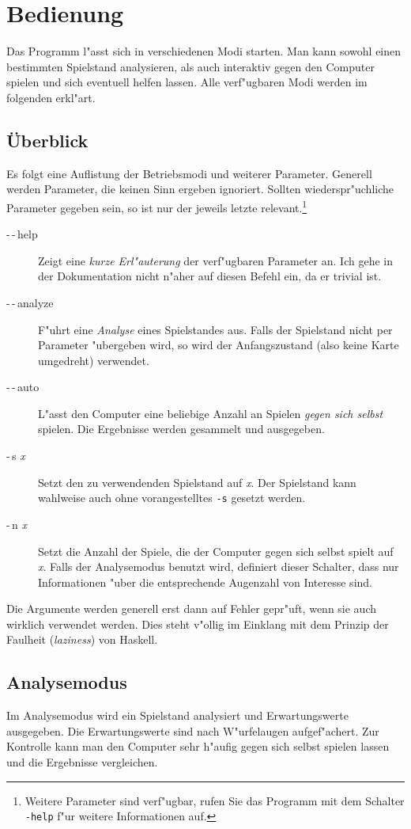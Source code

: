 \documentclass{scrreprt}
\begin{document}
\chapter{Bedienung}
Das Programm l"asst sich in verschiedenen Modi starten.  Man kann sowohl einen
bestimmten Spielstand analysieren, als auch interaktiv gegen den Computer
spielen und sich eventuell helfen lassen.  Alle verf"ugbaren Modi werden im
folgenden erkl"art.

\section{Überblick}
Es folgt eine Auflistung der Betriebsmodi und weiterer Parameter.  Generell
werden Parameter, die keinen Sinn ergeben ignoriert.  Sollten wiederspr"uchliche
Parameter gegeben sein, so ist nur der jeweils letzte relevant.\footnote{Weitere
Parameter sind verf"ugbar, rufen Sie das Programm mit dem Schalter \texttt
{-\-help} f"ur weitere Informationen auf.}

\begin{description}
\item[-\,-\,help] Zeigt eine \emph{kurze Erl"auterung} der verf"ugbaren
  Parameter an.  Ich gehe in der Dokumentation nicht n"aher auf diesen Befehl
  ein, da er trivial ist.
\item[-\,-\,analyze] F"uhrt eine \emph{Analyse} eines Spielstandes aus.  Falls
  der Spielstand nicht per Parameter "ubergeben wird, so wird der Anfangszustand
  (also keine Karte umgedreht) verwendet.
\item[-\,-\,auto] L"asst den Computer eine beliebige Anzahl an Spielen \emph
  {gegen sich selbst} spielen.  Die Ergebnisse werden gesammelt und ausgegeben.
\item[-\,s \textit{x}] Setzt den zu verwendenden Spielstand auf \textit{x}.  Der
  Spielstand kann wahlweise auch ohne vorangestelltes \texttt{-s} gesetzt
  werden.
\item[-\,n \textit{x}] Setzt die Anzahl der Spiele, die der Computer gegen sich
  selbst spielt auf \textit{x}.  Falls der Analysemodus benutzt wird, definiert
  dieser Schalter, dass nur Informationen "uber die entsprechende Augenzahl von
  Interesse sind.
\end{description}

Die Argumente werden generell erst dann auf Fehler gepr"uft, wenn sie auch
wirklich verwendet werden.  Dies steht v"ollig im Einklang mit dem Prinzip der
Faulheit (\emph{laziness}) von Haskell.

\section{Analysemodus}
Im Analysemodus wird ein Spielstand analysiert und Erwartungswerte ausgegeben.
Die Erwartungswerte sind nach W"urfelaugen aufgef"achert.  Zur Kontrolle kann
man den Computer sehr h"aufig gegen sich selbst spielen lassen und die
Ergebnisse vergleichen.
\end{document}
